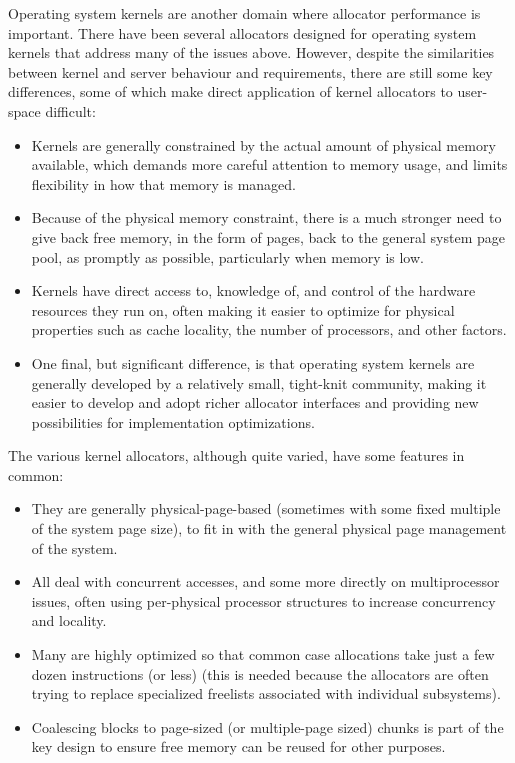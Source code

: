 \documentclass[dvips,11pt]{article}
\begin{document}
Operating system kernels are another domain where allocator performance is
important.  There have been several allocators designed for operating
system kernels that address many of the issues above.  However, despite the
similarities between kernel and server behaviour and requirements, there
are still some key differences, some of which make direct application of
kernel allocators to user-space difficult:
\begin{itemize}
\item Kernels are generally constrained by the actual amount of physical
  memory available, which demands more careful attention to memory usage,
  and limits flexibility in how that memory is managed.
\item Because of the physical memory constraint, there is a much stronger
  need to give back free memory, in the form of pages, back to the general
  system page pool, as promptly as possible, particularly when memory is
  low.
\item Kernels have direct access to, knowledge of, and control of the
  hardware resources they run on, often making it easier to optimize for
  physical properties such as cache locality, the number of processors, and
  other factors.
\item One final, but significant difference, is that operating system
  kernels are generally developed by a relatively small, tight-knit
  community, making it easier to develop and adopt richer allocator
  interfaces and providing new possibilities for implementation
  optimizations. 
\end{itemize}
The various kernel allocators, although quite varied, have some features in
common:
\begin{itemize}
\item They are generally physical-page-based (sometimes with some fixed
  multiple of the system page size), to fit in with the general physical page
  management of the system.
\item All deal with concurrent accesses, and some more directly on
  multiprocessor issues, often using per-physical processor structures to
  increase concurrency and locality.
\item Many are highly optimized so that common case allocations take just a 
  few dozen instructions (or less) (this is needed because the allocators
  are often trying to replace specialized freelists associated with
  individual subsystems).
\item Coalescing blocks to page-sized (or multiple-page sized) chunks is
  part of the key design to ensure free memory can be reused for other
  purposes. 
\end{itemize}
\end{document}
